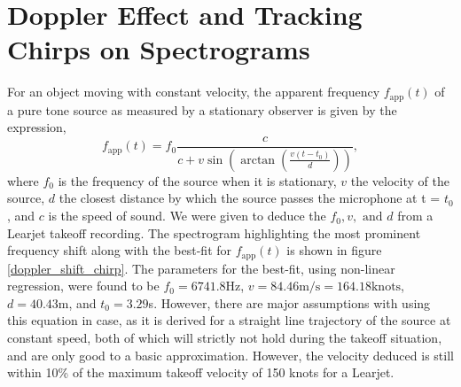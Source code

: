 \documentclass[10pt]{article}
\begin{document}
\section{Doppler Effect and Tracking Chirps on Spectrograms}
For an object moving with constant velocity, the apparent frequency $f_\text{app}(t)$ of a pure tone source as measured by a stationary observer is given by the expression,
\[
f_\text{app}(t) = f_0 \frac{c}{c + v\sin\left(\arctan\left(\frac{v(t-t_0)}{d}\right)\right)},
\]
where $f_0$ is the frequency of the source when it is stationary, $v$ the velocity of the source, $d$ the closest distance by which the source passes the microphone at t = $t_0$, and $c$ is the speed of sound. We were given to deduce the $f_0, v, \text{ and } d$ from a Learjet takeoff recording. The spectrogram highlighting the most prominent frequency shift along with the best-fit for $f_\text{app}(t)$ is shown in figure \ref{doppler_shift_chirp}. The parameters for the best-fit, using non-linear regression, were found to be $f_0 = 6741.8$Hz, $v = 84.46\text{m/s} = 164.18\text{knots}$, $d=40.43$m, and $t_0 = 3.29$s. However, there are major assumptions with using this equation in case, as it is derived for a straight line trajectory of the source at constant speed, both of which will strictly not hold during the takeoff situation, and are only good to a basic approximation. However, the velocity deduced is still within 10\% of the maximum takeoff velocity of 150 knots for a Learjet.
\end{document}
